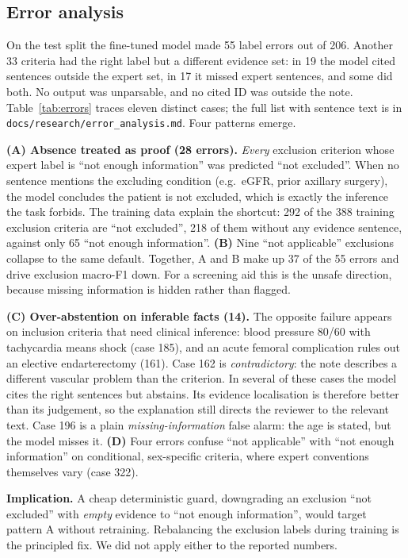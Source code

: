 \subsection{Error analysis}\label{sec:errors}
On the test split the fine-tuned model made 55 label errors out of 206. Another 33 criteria had the right label but a different evidence set: in 19 the model cited sentences outside the expert set, in 17 it missed expert sentences, and some did both. No output was unparsable, and no cited ID was outside the note. Table~\ref{tab:errors} traces eleven distinct cases; the full list with sentence text is in \texttt{docs/research/error\_analysis.md}. Four patterns emerge.

\textbf{(A) Absence treated as proof (28 errors).} \emph{Every} exclusion criterion whose expert label is ``not enough information'' was predicted ``not excluded''. When no sentence mentions the excluding condition (e.g.\ eGFR, prior axillary surgery), the model concludes the patient is not excluded, which is exactly the inference the task forbids. The training data explain the shortcut: 292 of the 388 training exclusion criteria are ``not excluded'', 218 of them without any evidence sentence, against only 65 ``not enough information''. \textbf{(B)} Nine ``not applicable'' exclusions collapse to the same default. Together, A and B make up 37 of the 55 errors and drive exclusion macro-F1 down. For a screening aid this is the unsafe direction, because missing information is hidden rather than flagged.

\textbf{(C) Over-abstention on inferable facts (14).} The opposite failure appears on inclusion criteria that need clinical inference: blood pressure 80/60 with tachycardia means shock (case 185), and an acute femoral complication rules out an elective endarterectomy (161). Case 162 is \emph{contradictory}: the note describes a different vascular problem than the criterion. In several of these cases the model cites the right sentences but abstains. Its evidence localisation is therefore better than its judgement, so the explanation still directs the reviewer to the relevant text. Case 196 is a plain \emph{missing-information} false alarm: the age is stated, but the model misses it. \textbf{(D)} Four errors confuse ``not applicable'' with ``not enough information'' on conditional, sex-specific criteria, where expert conventions themselves vary (case 322).

\textbf{Implication.} A cheap deterministic guard, downgrading an exclusion ``not excluded'' with \emph{empty} evidence to ``not enough information'', would target pattern A without retraining. Rebalancing the exclusion labels during training is the principled fix. We did not apply either to the reported numbers.

